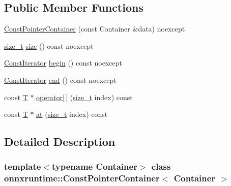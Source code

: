 \subsection*{Public Member Functions}
\begin{DoxyCompactItemize}
\item 
\mbox{\hyperlink{classonnxruntime_1_1ConstPointerContainer_aa3a7b16295f4fc28a0c8ff0f6496d8bc}{Const\+Pointer\+Container}} (const Container \&data) noexcept
\item 
\mbox{\hyperlink{mlasi_8h_a503efbc1c6e50825320ad909366b78ab}{size\+\_\+t}} \mbox{\hyperlink{classonnxruntime_1_1ConstPointerContainer_ad00280a4451d2940c2a92b57a911c8b6}{size}} () const noexcept
\item 
\mbox{\hyperlink{classonnxruntime_1_1ConstPointerContainer_1_1ConstIterator}{Const\+Iterator}} \mbox{\hyperlink{classonnxruntime_1_1ConstPointerContainer_a4258aee4f1929a1719b6a8f161ce44d5}{begin}} () const noexcept
\item 
\mbox{\hyperlink{classonnxruntime_1_1ConstPointerContainer_1_1ConstIterator}{Const\+Iterator}} \mbox{\hyperlink{classonnxruntime_1_1ConstPointerContainer_add25e6d3a73482c2308f787aa68ba619}{end}} () const noexcept
\item 
const \mbox{\hyperlink{classonnxruntime_1_1ConstPointerContainer_ae78936c3220735b7dba8004b7d5c9888}{T}} $\ast$ \mbox{\hyperlink{classonnxruntime_1_1ConstPointerContainer_a2727aacb6accf597f5c16d7ae922ba2f}{operator\mbox{[}$\,$\mbox{]}}} (\mbox{\hyperlink{mlasi_8h_a503efbc1c6e50825320ad909366b78ab}{size\+\_\+t}} index) const
\item 
const \mbox{\hyperlink{classonnxruntime_1_1ConstPointerContainer_ae78936c3220735b7dba8004b7d5c9888}{T}} $\ast$ \mbox{\hyperlink{classonnxruntime_1_1ConstPointerContainer_a8e9d402cb3a0b535da9a5864527d8bd9}{at}} (\mbox{\hyperlink{mlasi_8h_a503efbc1c6e50825320ad909366b78ab}{size\+\_\+t}} index) const
\end{DoxyCompactItemize}


\subsection{Detailed Description}
\subsubsection*{template$<$typename Container$>$\newline
class onnxruntime\+::\+Const\+Pointer\+Container$<$ Container $>$}

